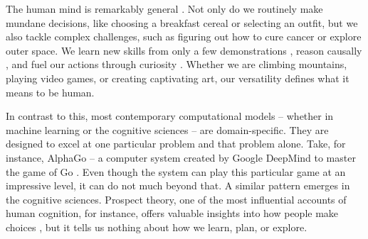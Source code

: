 \documentclass[pdflatex,sn-nature]{sn-jnl}%
\theoremstyle{thmstyleone}%
\theoremstyle{thmstyletwo}%
\theoremstyle{thmstylethree}%
\begin{document}
The human mind is remarkably general \cite{lake2017building, lake2023human, wu2024unifying}. Not only do we routinely make mundane decisions, like choosing a breakfast cereal or selecting an outfit, but we also tackle complex challenges, such as figuring out how to cure cancer or explore outer space. We learn new skills from only a few demonstrations \cite{lake2015human}, reason causally \cite{goddu2024development}, and fuel our actions through curiosity \cite{chu2020play}. Whether we are climbing mountains, playing video games, or creating captivating art, our versatility defines what it means to be human.

In contrast to this, most contemporary computational models -- whether in machine learning or the cognitive sciences -- are domain-specific. They are designed to excel at one particular problem and that problem alone. Take, for instance, AlphaGo -- a computer system created by Google DeepMind to master the game of Go  \cite{silver2017mastering}. Even though the system can play this particular game at an impressive level, it can do not much beyond that. A similar pattern emerges in the cognitive sciences. Prospect theory, one of the most influential accounts of human cognition, for instance, offers valuable insights into how people make choices \cite{kahneman2013prospect}, but it tells us nothing about how we learn, plan, or explore.
\end{document}
